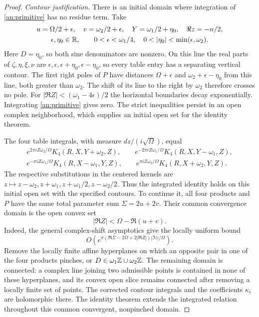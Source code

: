\begin{proof}
\emph{Contour justification.}
There is an initial domain where integration of
\eqref{an:primitive} has no residue term.  Take
\begin{gather*}
 u=\Omega/2+\epsilon,\quad v=\omega_2/2+\epsilon,\quad
 Y=\omega_1/2+\eta_0,\quad \Re z=-n/2,\\
 \epsilon,\eta_0\in\R,\qquad
 0<\epsilon<\omega_1/4,\quad0<|\eta_0|<\min(\epsilon,\omega_2).
\end{gather*}
Here $D=\eta_0$, so both sine denominators are nonzero.
On this line the real parts of $\zeta,\eta,\xi,\nu$ are
$\epsilon,\epsilon,\epsilon+\eta_0,\epsilon-\eta_0$, so
every table entry has a separating vertical contour.  The first
right poles of $P$ have distances $\Omega+\epsilon$ and
$\omega_2+\epsilon-\eta_0$ from this line, both greater than $\omega_2$.
The shift of its line to the right by $\omega_2$ therefore crosses no pole.
For $|\Re Z|<(\omega_1-4\epsilon)/2$ the horizontal boundaries decay
exponentially.  Integrating \eqref{an:primitive} gives zero.
The strict inequalities persist in an open complex neighborhood,
which supplies an initial open set for the identity theorem.

The four table integrals, with measure $dz/(i\sqrt\Omega)$, equal
\begin{gather*}
 e^{2\pi iZ\omega_2/\Omega}K_4(R,X,Y+\omega_2,Z),\qquad
 e^{-2\pi iZ\omega_1/\Omega}K_4(R,X,Y-\omega_1,Z),\\
 e^{-\pi iZ\omega_1/\Omega}K_4(R,X-\omega_1,Y,Z),\qquad
 e^{\pi iZ\omega_2/\Omega}K_4(R,X+\omega_2,Y,Z).
\end{gather*}
The respective substitutions in the centered kernels are
$z\mapsto z-\omega_2,z+\omega_1,z+\omega_1/2,z-\omega_2/2$.  Thus the integrated identity
holds on this initial open set with the specified contours.
To continue it, all four products and $P$ have the same total parameter sum
$\Sigma=2u+2v$.  Their common convergence domain is the open convex set
\[
 |\Re Z|<\Omega-\Re(u+v).
\]
Indeed, the general complex-shift asymptotics give the locally uniform
bound
\[
 O\!\left(e^{\pi(\Re\Sigma-2\Omega+2|\Re Z|)|\Im z|/\Omega}\right).
\]
Remove the locally finite affine hyperplanes on which an opposite
pair in one of the four products pinches, or
$D\in\omega_1\mathbb Z\cup\omega_2\mathbb Z$.  The remaining domain is connected:
a complex line joining two admissible points is contained in none of
these hyperplanes, and its convex open slice remains connected after
removing a locally finite set of points.  The corrected contour
integrals and the coefficients $\kappa_i$ are holomorphic there.
The identity theorem extends the integrated relation throughout this
common convergent, nonpinched domain.


\end{proof}
